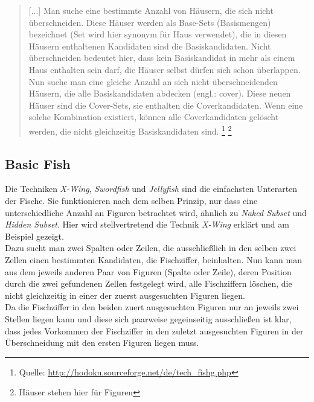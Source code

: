 \documentclass[accentcolor=tud6b,11pt,paper=a4]{tudreport}
\begin{document}
\begin{quote}[...] Man suche eine bestimmte Anzahl von Häusern, die sich nicht überschneiden. Diese Häuser werden als Base-Sets (Basismengen) bezeichnet (Set wird hier synonym für Haus verwendet), die in diesen Häusern enthaltenen Kandidaten sind die Basiskandidaten. Nicht überschneiden bedeutet hier, dass kein Basiskandidat in mehr als einem Haus enthalten sein darf, die Häuser selbst dürfen sich schon überlappen. Nun suche man eine gleiche Anzahl an sich nicht überschneidenden Häusern, die alle Basiskandidaten abdecken (engl.: cover). Diese neuen Häuser sind die Cover-Sets, sie enthalten die Coverkandidaten. Wenn eine solche Kombination existiert, können alle Coverkandidaten gelöscht werden, die nicht gleichzeitig Basiskandidaten sind.
\footnote{Quelle: \url{http://hodoku.sourceforge.net/de/tech_fishg.php}}
\footnote{Häuser stehen hier für Figuren}
\end{quote}


\newpage
\subsection{Basic Fish}
\label{X-Wing}
Die Techniken \textit{X-Wing}, \textit{Swordfish} und \textit{Jellyfish} sind die einfachsten Unterarten der Fische. Sie funktionieren nach dem selben Prinzip, nur dass eine unterschiedliche Anzahl an Figuren betrachtet wird, ähnlich zu \textit{Naked Subset} und \textit{Hidden Subset}. Hier wird stellvertretend die Technik \textit{X-Wing} erklärt und am Beispiel gezeigt.\\
Dazu sucht man zwei Spalten oder Zeilen, die ausschließlich in den selben zwei Zellen einen bestimmten Kandidaten, die Fischziffer, beinhalten. Nun kann man aus dem jeweils anderen Paar von Figuren (Spalte oder Zeile), deren Position durch die zwei gefundenen Zellen festgelegt wird, alle Fischziffern löschen, die nicht gleichzeitig in einer der zuerst ausgesuchten Figuren liegen.\\
Da die Fischziffer in den beiden zuert ausgesuchten Figuren nur an jeweils zwei Stellen liegen kann und diese sich paarweise gegeinseitig ausschließen ist klar, dass jedes Vorkommen der Fischziffer in den zuletzt ausgesuchten Figuren in der Überschneidung mit den ersten Figuren liegen muss.
\end{document}
